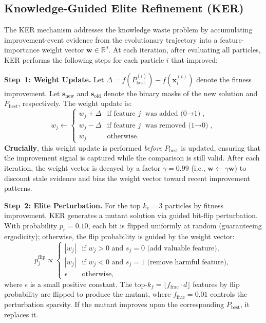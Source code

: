 \documentclass[a4paper,fleqn]{cas-dc}
\begin{document}
\begin{sloppypar}
	\subsection{Knowledge-Guided Elite Refinement (KER)}
	\label{sec:method:ker}

	\par{
	The KER mechanism addresses the knowledge waste problem by
	accumulating improvement-event evidence from the evolutionary
	trajectory into a feature-importance weight vector
	$\mathbf{w} \in \mathbb{R}^d$.
	At each iteration, after evaluating all particles, KER performs
	the following steps for each particle $i$ that improved:
	}

	\par{
	\textbf{Step~1: Weight Update.}
	Let $\Delta = f(P_{\mathrm{best}}^{(i)}) - f(\mathbf{x}_i^{(t)})$
	denote the fitness improvement.
	Let $\mathbf{s}_{\mathrm{new}}$ and $\mathbf{s}_{\mathrm{old}}$ denote
	the binary masks of the new solution and $P_{\mathrm{best}}$,
	respectively.
	The weight update is:
	\begin{equation}
		w_j \leftarrow \begin{cases}
			w_j + \Delta & \text{if feature } j \text{ was added (0$\to$1)}, \\
			w_j - \Delta & \text{if feature } j \text{ was removed (1$\to$0)}, \\
			w_j           & \text{otherwise}.
		\end{cases}
		\label{eq:weight_update}
	\end{equation}
	\textbf{Crucially}, this weight update is performed \emph{before}
	$P_{\mathrm{best}}$ is updated, ensuring that the improvement
	signal is captured while the comparison is still valid.
	After each iteration, the weight vector is decayed by a factor
	$\gamma = 0.99$ (i.e., $\mathbf{w} \leftarrow \gamma \mathbf{w}$)
	to discount stale evidence and bias the weight vector toward
	recent improvement patterns.
	}

	\par{
	\textbf{Step~2: Elite Perturbation.}
	For the top $k_e = 3$ particles by fitness improvement, KER
	generates a mutant solution via guided bit-flip perturbation.
	With probability $p_r = 0.10$, each bit is flipped uniformly at
	random (guaranteeing ergodicity); otherwise, the flip probability
	is guided by the weight vector:
	\begin{equation}
		p_j^{\mathrm{flip}} \propto \begin{cases}
			|w_j| & \text{if } w_j > 0 \text{ and } s_j = 0
			\text{ (add valuable feature)}, \\
			|w_j| & \text{if } w_j < 0 \text{ and } s_j = 1
			\text{ (remove harmful feature)}, \\
			\epsilon & \text{otherwise},
		\end{cases}
		\label{eq:flip_prob}
	\end{equation}
	where $\epsilon$ is a small positive constant.
	The top-$k_f = \lfloor f_{\mathrm{frac}} \cdot d \rfloor$ features
	by flip probability are flipped to produce the mutant, where
	$f_{\mathrm{frac}} = 0.01$ controls the perturbation sparsity.
	If the mutant improves upon the corresponding $P_{\mathrm{best}}$,
	it replaces it.
	}


\end{sloppypar}
\end{document}

